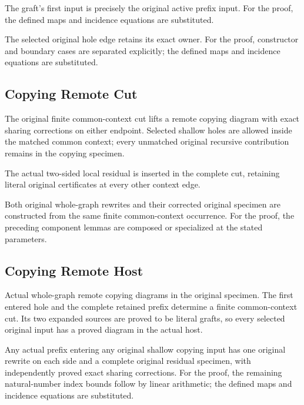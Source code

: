 The graft's first input is precisely the original active prefix input.
For the proof, the defined maps and incidence equations are substituted.
\par{}

The selected original hole edge retains its exact owner.
For the proof, constructor and boundary cases are separated explicitly; the defined maps and incidence equations are substituted.
\par{}

\subsection{Copying Remote Cut}
The original finite common-context cut lifts a remote copying diagram with exact sharing corrections on either endpoint. Selected shallow holes are allowed inside the matched common context; every unmatched original recursive contribution remains in the copying specimen.

The actual two-sided local residual is inserted in the complete cut, retaining literal original certificates at every other context edge.
\par{}

Both original whole-graph rewrites and their corrected original specimen are constructed from the same finite common-context occurrence.
For the proof, the preceding component lemmas are composed or specialized at the stated parameters.
\par{}

\subsection{Copying Remote Host}
Actual whole-graph remote copying diagrams in the original specimen. The first entered hole and the complete retained prefix determine a finite common-context cut. Its two expanded sources are proved to be literal grafts, so every selected original input has a proved diagram in the actual host.

Any actual prefix entering any original shallow copying input has one original rewrite on each side and a complete original residual specimen, with independently proved exact sharing corrections.
For the proof, the remaining natural-number index bounds follow by linear arithmetic; the defined maps and incidence equations are substituted.
\par{}

